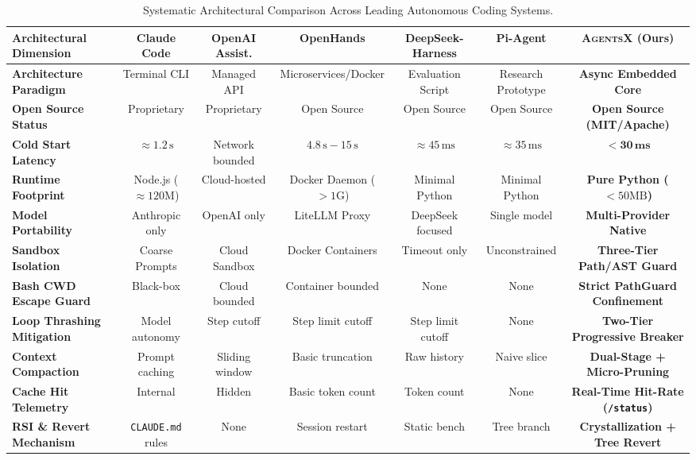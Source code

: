 \documentclass[10pt,twocolumn,letterpaper]{article}
\begin{document}
\begin{table}[t]
\centering
\small
\caption{Systematic Architectural Comparison Across Leading Autonomous Coding Systems.}
\label{tab:comparison}
\begin{tabular}{lcccccc}
\toprule
\textbf{Architectural Dimension} & \textbf{Claude Code} & \textbf{OpenAI Assist.} & \textbf{OpenHands} & \textbf{DeepSeek-Harness} & \textbf{Pi-Agent} & \textbf{\textsc{AgentsX} (Ours)} \\
\midrule
\textbf{Architecture Paradigm} & Terminal CLI & Managed API & Microservices/Docker & Evaluation Script & Research Prototype & \textbf{Async Embedded Core} \\
\textbf{Open Source Status} & Proprietary & Proprietary & Open Source & Open Source & Open Source & \textbf{Open Source (MIT/Apache)} \\
\textbf{Cold Start Latency} & $\approx 1.2\,\text{s}$ & Network bounded & $4.8\,\text{s} - 15\,\text{s}$ & $\approx 45\,\text{ms}$ & $\approx 35\,\text{ms}$ & $\mathbf{< 30\,\text{ms}}$ \\
\textbf{Runtime Footprint} & Node.js ($\approx 120\text{M}$) & Cloud-hosted & Docker Daemon ($>1\text{G}$) & Minimal Python & Minimal Python & \textbf{Pure Python ($< 50\text{MB}$)} \\
\textbf{Model Portability} & Anthropic only & OpenAI only & LiteLLM Proxy & DeepSeek focused & Single model & \textbf{Multi-Provider Native} \\
\textbf{Sandbox Isolation} & Coarse Prompts & Cloud Sandbox & Docker Containers & Timeout only & Unconstrained & \textbf{Three-Tier Path/AST Guard} \\
\textbf{Bash CWD Escape Guard} & Black-box & Cloud bounded & Container bounded & None & None & \textbf{Strict PathGuard Confinement} \\
\textbf{Loop Thrashing Mitigation} & Model autonomy & Step cutoff & Step limit cutoff & Step limit cutoff & None & \textbf{Two-Tier Progressive Breaker} \\
\textbf{Context Compaction} & Prompt caching & Sliding window & Basic truncation & Raw history & Naive slice & \textbf{Dual-Stage + Micro-Pruning} \\
\textbf{Cache Hit Telemetry} & Internal & Hidden & Basic token count & Token count & None & \textbf{Real-Time Hit-Rate (\texttt{/status})} \\
\textbf{RSI \& Revert Mechanism} & \texttt{CLAUDE.md} rules & None & Session restart & Static bench & Tree branch & \textbf{Crystallization + Tree Revert} \\
\bottomrule
\end{tabular}
\end{table}
\end{document}
